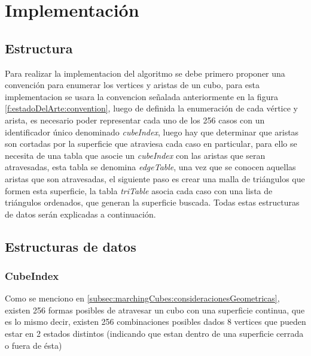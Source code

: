 \chapter{Implementación}
\label{ch:implementacion}

\section{Estructura}
\label{ch:implementacion:sec:estructura}

Para realizar la implementacion del algoritmo se debe primero proponer una convención para enumerar los vertices y aristas de un cubo, para esta implementacion se usara la convencion señalada anteriormente en la figura \ref{f:estadoDelArte:convention}, luego de definida la enumeración de cada vértice y arista, es necesario poder representar cada uno de los 256 casos con un identificador único denominado \emph{cubeIndex}, luego hay que determinar que aristas son cortadas por la superficie que atraviesa cada caso en particular, para ello se necesita de una tabla que asocie un \emph{cubeIndex} con las aristas que seran atravesadas, esta tabla se denomina \emph{edgeTable}, una vez que se conocen aquellas aristas que son atravesadas, el siguiente paso es crear una malla de triángulos que formen esta superficie, la tabla \emph{triTable} asocia cada caso con una lista de triángulos ordenados, que generan la superficie buscada. Todas estas estructuras de datos serán explicadas a continuación.

\section{Estructuras de datos}
\label{ch:implementacion:sec:estructurasDeDatos}

\subsection{CubeIndex}
\label{ch:implementacion:sec:CubeIndex}

Como se menciono en \ref{subsec:marchingCubes:consideracionesGeometricas}, existen 256 formas posibles de atravesar un cubo con una superficie continua, que es lo mismo decir, existen 256 combinaciones posibles dados 8 vertices que pueden estar en 2 estados distintos (indicando que estan dentro de una superficie cerrada o fuera de ésta)

